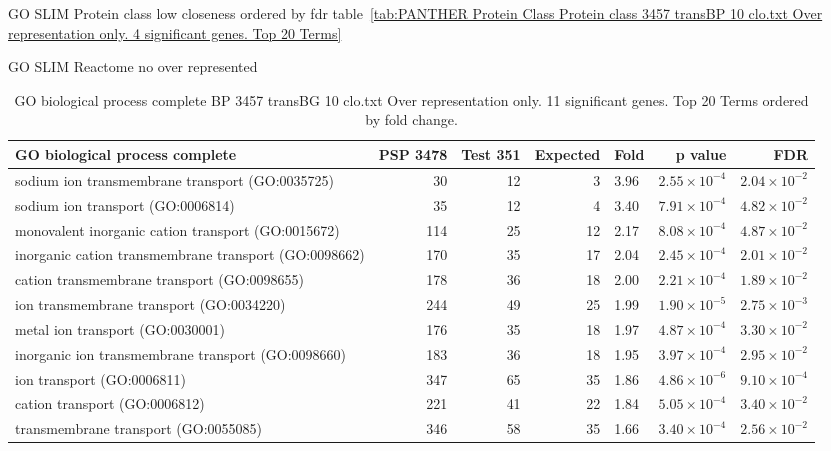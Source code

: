 GO SLIM Protein class low closeness ordered by fdr table~\ref{tab:PANTHER Protein Class Protein class 3457 transBP 10 clo.txt Over representation only. 4 significant genes. Top 20 Terms}

GO SLIM Reactome no over represented




\begin{table}[ht]
\centering
\begin{adjustbox}{width=\textwidth}
\begin{tabular}{lrrrlrr}
  \hline
GO biological process complete & PSP 3478 & Test 351 & Expected & Fold & p value & FDR \\ 
  \hline
sodium ion transmembrane transport (GO:0035725) & 30 & 12 & 3 & 3.96 & $2.55 \times 10^{-4}$ & $2.04 \times 10^{-2}$ \\ 
  sodium ion transport (GO:0006814) & 35 & 12 & 4 & 3.40 & $7.91 \times 10^{-4}$ & $4.82 \times 10^{-2}$ \\ 
  monovalent inorganic cation transport (GO:0015672) & 114 & 25 & 12 & 2.17 & $8.08 \times 10^{-4}$ & $4.87 \times 10^{-2}$ \\ 
  inorganic cation transmembrane transport (GO:0098662) & 170 & 35 & 17 & 2.04 & $2.45 \times 10^{-4}$ & $2.01 \times 10^{-2}$ \\ 
  cation transmembrane transport (GO:0098655) & 178 & 36 & 18 & 2.00 & $2.21 \times 10^{-4}$ & $1.89 \times 10^{-2}$ \\ 
  ion transmembrane transport (GO:0034220) & 244 & 49 & 25 & 1.99 & $1.90 \times 10^{-5}$ & $2.75 \times 10^{-3}$ \\ 
  metal ion transport (GO:0030001) & 176 & 35 & 18 & 1.97 & $4.87 \times 10^{-4}$ & $3.30 \times 10^{-2}$ \\ 
  inorganic ion transmembrane transport (GO:0098660) & 183 & 36 & 18 & 1.95 & $3.97 \times 10^{-4}$ & $2.95 \times 10^{-2}$ \\ 
  ion transport (GO:0006811) & 347 & 65 & 35 & 1.86 & $4.86 \times 10^{-6}$ & $9.10 \times 10^{-4}$ \\ 
  cation transport (GO:0006812) & 221 & 41 & 22 & 1.84 & $5.05 \times 10^{-4}$ & $3.40 \times 10^{-2}$ \\ 
  transmembrane transport (GO:0055085) & 346 & 58 & 35 & 1.66 & $3.40 \times 10^{-4}$ & $2.56 \times 10^{-2}$ \\ 
   \hline
\end{tabular}
\end{adjustbox}
\caption{GO biological process complete BP 3457 transBG 10 clo.txt Over representation only. 11 significant genes. Top 20 Terms ordered by fold change. } 
\label{tab:GO biological process complete BP 3457 transBG 10 clo.txt Over representation only. 11 significant genes. Top 20 Terms ordered by fold change. }
\end{table}


